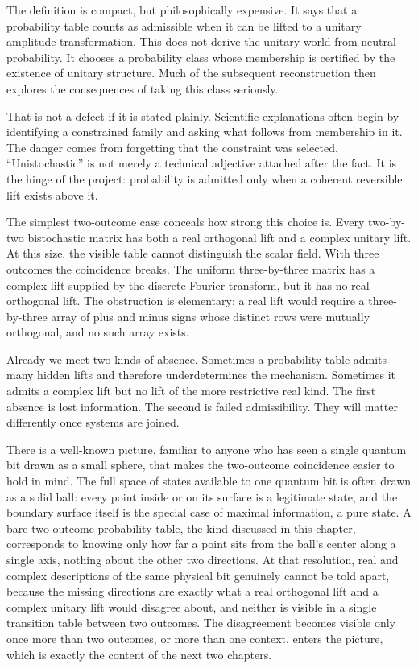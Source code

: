 \documentclass[12pt,openany]{book}
\begin{document}
The definition is compact, but philosophically expensive. It says that a probability table counts as admissible when it can be lifted to a unitary amplitude transformation. This does not derive the unitary world from neutral probability. It chooses a probability class whose membership is certified by the existence of unitary structure. Much of the subsequent reconstruction then explores the consequences of taking this class seriously.

That is not a defect if it is stated plainly. Scientific explanations often begin by identifying a constrained family and asking what follows from membership in it. The danger comes from forgetting that the constraint was selected. ``Unistochastic'' is not merely a technical adjective attached after the fact. It is the hinge of the project: probability is admitted only when a coherent reversible lift exists above it.

The simplest two-outcome case conceals how strong this choice is. Every two-by-two bistochastic matrix has both a real orthogonal lift and a complex unitary lift. At this size, the visible table cannot distinguish the scalar field. With three outcomes the coincidence breaks. The uniform three-by-three matrix has a complex lift supplied by the discrete Fourier transform, but it has no real orthogonal lift. The obstruction is elementary: a real lift would require a three-by-three array of plus and minus signs whose distinct rows were mutually orthogonal, and no such array exists.

Already we meet two kinds of absence. Sometimes a probability table admits many hidden lifts and therefore underdetermines the mechanism. Sometimes it admits a complex lift but no lift of the more restrictive real kind. The first absence is lost information. The second is failed admissibility. They will matter differently once systems are joined.

There is a well-known picture, familiar to anyone who has seen a single quantum bit drawn as a small sphere, that makes the two-outcome coincidence easier to hold in mind. The full space of states available to one quantum bit is often drawn as a solid ball: every point inside or on its surface is a legitimate state, and the boundary surface itself is the special case of maximal information, a pure state. A bare two-outcome probability table, the kind discussed in this chapter, corresponds to knowing only how far a point sits from the ball's center along a single axis, nothing about the other two directions. At that resolution, real and complex descriptions of the same physical bit genuinely cannot be told apart, because the missing directions are exactly what a real orthogonal lift and a complex unitary lift would disagree about, and neither is visible in a single transition table between two outcomes. The disagreement becomes visible only once more than two outcomes, or more than one context, enters the picture, which is exactly the content of the next two chapters.
\end{document}
